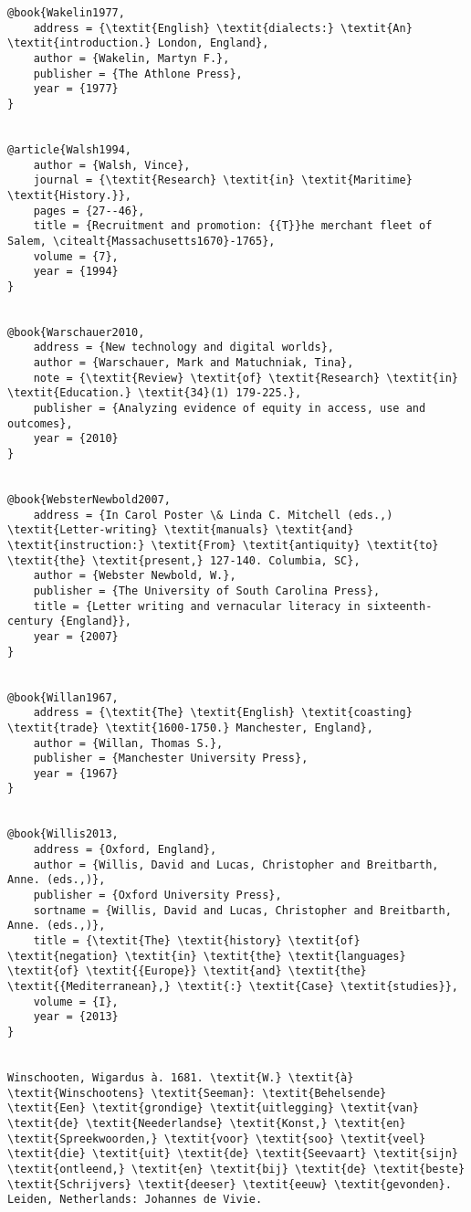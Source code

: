 \begin{verbatim}
@book{Wakelin1977,
	address = {\textit{English} \textit{dialects:} \textit{An} \textit{introduction.} London, England},
	author = {Wakelin, Martyn F.},
	publisher = {The Athlone Press},
	year = {1977}
}


@article{Walsh1994,
	author = {Walsh, Vince},
	journal = {\textit{Research} \textit{in} \textit{Maritime} \textit{History.}},
	pages = {27--46},
	title = {Recruitment and promotion: {{T}}he merchant fleet of Salem, \citealt{Massachusetts1670}-1765},
	volume = {7},
	year = {1994}
}


@book{Warschauer2010,
	address = {New technology and digital worlds},
	author = {Warschauer, Mark and Matuchniak, Tina},
	note = {\textit{Review} \textit{of} \textit{Research} \textit{in} \textit{Education.} \textit{34}(1) 179-225.},
	publisher = {Analyzing evidence of equity in access, use and outcomes},
	year = {2010}
}


@book{WebsterNewbold2007,
	address = {In Carol Poster \& Linda C. Mitchell (eds.,) \textit{Letter-writing} \textit{manuals} \textit{and} \textit{instruction:} \textit{From} \textit{antiquity} \textit{to} \textit{the} \textit{present,} 127-140. Columbia, SC},
	author = {Webster Newbold, W.},
	publisher = {The University of South Carolina Press},
	title = {Letter writing and vernacular literacy in sixteenth-century {England}},
	year = {2007}
}


@book{Willan1967,
	address = {\textit{The} \textit{English} \textit{coasting} \textit{trade} \textit{1600-1750.} Manchester, England},
	author = {Willan, Thomas S.},
	publisher = {Manchester University Press},
	year = {1967}
}


@book{Willis2013,
	address = {Oxford, England},
	author = {Willis, David and Lucas, Christopher and Breitbarth, Anne. (eds.,)},
	publisher = {Oxford University Press},
	sortname = {Willis, David and Lucas, Christopher and Breitbarth, Anne. (eds.,)},
	title = {\textit{The} \textit{history} \textit{of} \textit{negation} \textit{in} \textit{the} \textit{languages} \textit{of} \textit{{Europe}} \textit{and} \textit{the} \textit{{Mediterranean},} \textit{:} \textit{Case} \textit{studies}},
	volume = {I},
	year = {2013}
}


Winschooten, Wigardus à. 1681. \textit{W.} \textit{à} \textit{Winschootens} \textit{Seeman}: \textit{Behelsende} \textit{Een} \textit{grondige} \textit{uitlegging} \textit{van} \textit{de} \textit{Neederlandse} \textit{Konst,} \textit{en} \textit{Spreekwoorden,} \textit{voor} \textit{soo} \textit{veel} \textit{die} \textit{uit} \textit{de} \textit{Seevaart} \textit{sijn} \textit{ontleend,} \textit{en} \textit{bij} \textit{de} \textit{beste} \textit{Schrijvers} \textit{deeser} \textit{eeuw} \textit{gevonden}. Leiden, Netherlands: Johannes de Vivie.


\end{verbatim}
